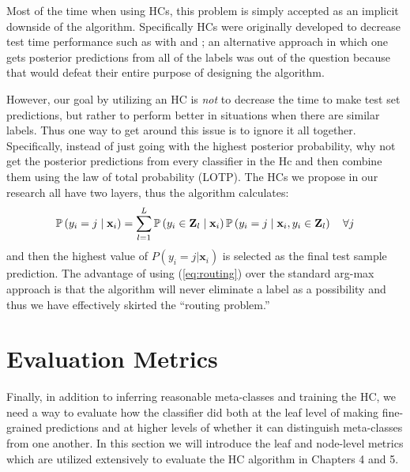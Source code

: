 \documentclass[../thesis.tex]{subfiles}
\begin{document}
Most of the time when using HCs, this problem is simply accepted as an implicit downside of the algorithm. Specifically HCs were originally developed to decrease test time performance such as with \cite{vural2004hierarchical} and \cite{bengio2010label}; an alternative approach in which one gets posterior predictions from all of the labels was out of the question because that would defeat their entire purpose of designing the algorithm.

However, our goal by utilizing an HC is \textit{not} to decrease the time to make test set predictions, but rather to perform better in situations when there are similar labels. Thus one way to get around this issue is to ignore it all together. Specifically, instead of just going with the highest posterior probability, why not get the posterior predictions from every classifier in the Hc and then combine them using the law of total probability (LOTP). The HCs we propose in our research all have two layers, thus the algorithm calculates:
\begin{equation}
    \label{eq:routing}
    \P\left(y_i = j \mid \mathbf{x}_i \right) = \sum_{l=1}^L \P\left(y_i \in \mathbf{Z}_l \mid \mathbf{x}_i\right) \P\left(y_i = j \mid \mathbf{x}_i, y_i \in \mathbf{Z}_l\right) \quad \forall j
\end{equation}
and then the highest value of $P(y_i = j | \mathbf{x}_i)$ is selected as the final test sample prediction. The advantage of using (\ref{eq:routing}) over the standard arg-max approach is that the algorithm will never eliminate a label as a possibility and thus we have effectively skirted the ``routing problem.''

\section{Evaluation Metrics}
Finally, in addition to inferring reasonable meta-classes and training the HC, we need a way to evaluate how the classifier did both at the leaf level of making fine-grained predictions and at higher levels of whether it can distinguish meta-classes from one another. In this section we will introduce the leaf and node-level metrics which are utilized extensively to evaluate the HC algorithm in Chapters 4 and 5. 
\end{document}

